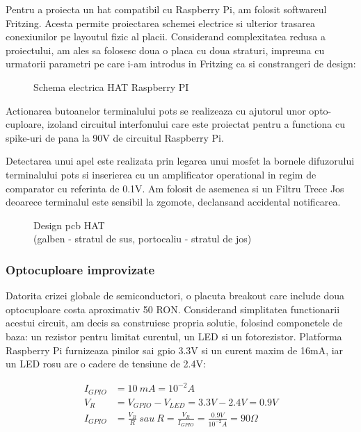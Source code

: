 Pentru a proiecta un \acrfull{hat} compatibil cu Raspberry Pi, am folosit softwareul Fritzing. Acesta permite proiectarea schemei electrice si ulterior trasarea conexiunilor pe layoutul fizic al placii. Considerand complexitatea redusa a proiectului, am ales sa folosesc doua o placa cu doua straturi, impreuna cu urmatorii parametri pe care i-am introdus in Fritzing ca si constrangeri de design:

\begin{figure}[h!]
  \centering
  \caption{Schema electrica HAT Raspberry PI}
\end{figure}

Actionarea butoanelor terminalului \acrshort{pots} se realizeaza cu ajutorul unor opto-cuploare, izoland circuitul interfonului care este proiectat pentru a functiona cu spike-uri de pana la 90V de circuitul Raspberry Pi.

Detectarea unui apel este realizata prin legarea unui \acrfull{mosfet} la bornele difuzorului terminalului \acrshort{pots} si inserierea cu un amplificator operational in regim de comparator cu referinta de 0.1V. Am folosit de asemenea si un Filtru Trece Jos deoarece terminalul este sensibil la zgomote, declansand accidental notificarea.

\begin{figure}[h!]
  \centering
  \caption{Design \acrshort{pcb} HAT \\(galben - stratul de sus, portocaliu - stratul de jos)}
\end{figure}

\subsubsection {Optocuploare improvizate}

Datorita crizei globale de semiconductori, o placuta breakout care include doua optocuploare costa aproximativ 50 RON. Considerand simplitatea functionarii acestui circuit, am decis sa construiesc propria solutie, folosind componetele de baza: un rezistor pentru limitat curentul, un LED si un fotorezistor. Platforma Raspberry Pi furnizeaza pinilor sai \acrshort{gpio} 3.3V si un curent maxim de 16mA, iar un LED rosu are o cadere de tensiune de 2.4V:

\begin{equation}
\label{eq:test}
\begin{split}
I_{GPIO} & =10\ mA=10^{-2} A\\
V_{R} & =V_{GPIO} -V_{LED} =3.3V-2.4V=0.9V\\
I_{GPIO} & =\frac{V_{R}}{R} \ sau\ R=\frac{V_{R}}{I_{GPIO}} =\frac{0.9V}{10^{-2}A} =90\Omega
\end{split}
\end{equation}

